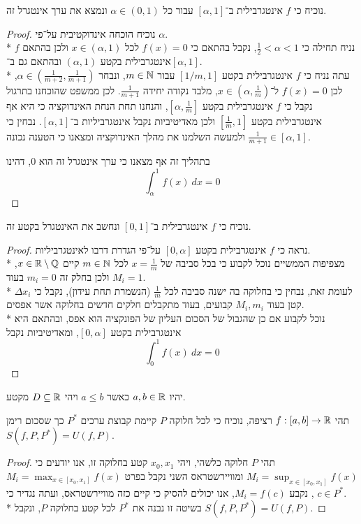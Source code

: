 \Subquestion{}
נוכיח כי $f$ אינטגרבילית ב־$[\alpha, 1]$ עבור כל $\alpha \in (0, 1)$ ונמצא את ערך אינטגרל זה.
\begin{proof}
	נוכיח הוכחה אינדוקטיבית על־פי $\alpha$. \\*
	נניח תחילה כי $\frac{1}{2} < \alpha < 1$, נקבל בהתאם כי $f(x) = 0$ לכל $x \in (\alpha, 1)$ ולכן בהתאם $f$ אינטגרבילית בקטע $(\alpha, 1)$ ובהתאם גם ב־$[\alpha, 1]$. \\*
	עתה נניח כי $f$ אינטגרבילית בקטע $[1/m, 1]$ עבור $m \in \mathbb{N}$, ונבחר $\alpha \in (\frac{1}{m + 2}, \frac{1}{m + 1})$, לכן $f(x) = 0$ ל־$x \in (\alpha, \frac{1}{m})$, מלבד נקודה יחידה $\frac{1}{m + 1}$.
	לכן ממשפט שהוכחנו בתרגול נקבל כי $f$ אינטגרבילית בקטע $[\alpha, \frac{1}{m}]$, והנחנו תחת הנחת האינדוקציה כי היא אף אינטגרבילית בקטע $[\frac{1}{m}, 1]$ ולכן מאדיטיביות נקבל אינטגרביליות ב־$[\alpha, 1]$.
	נבחין כי $\frac{1}{m + 1} \in [\alpha, 1]$ ולמעשה השלמנו את מהלך האינדוקציה ומצאנו כי הטענה נכונה.

	בתהליך זה אף מצאנו כי ערך אינטגרל זה הוא $0$, דהינו
	\[
		\int_{\alpha}^{1} f(x)\ dx = 0
	\]
\end{proof}

\Subquestion{}
נוכיח כי $f$ אינטגרבילית ב־$[0, 1]$ ונחשב את האינטגרל בקטע זה.
\begin{proof}
	נראה כי $f$ אינטגרבילית בקטע $[0, \alpha]$ על־פי הגדרת דרבו לאינטגרביליות. \\*
	מצפיפות הממשיים נוכל לקבוע כי בכל סביבה של $x = \frac{1}{m}$ לכל $m \in \mathbb{N}$ קיים $x \in \mathbb{R} \setminus \mathbb{Q}$, ולכן בחלק זה $m_i = 0$ בעוד $M_i = 1$. \\*
	לעומת זאת, נבחין כי בחלוקה בה ישנה סביבה לכל $\frac{1}{m}$ (הנשמרת תחת עידון), נקבל כי $\Delta x_i$ קטן בעוד $M_i, m_i$ קבועים, בעוד מתקבלים חלקים חדשים בחלוקה אשר אפסים. \\*
	נוכל לקבוע אם כן שהגבול של הסכום העליון של הפונקציה הוא אפס, ובהתאם היא אינטגרבילית בקטע $[0, \alpha]$, ומאדיטיביות נקבל
	\[
		\int_{0}^{1} f(x)\ dx = 0
	\]
\end{proof}

\Question{}
יהיו $a, b \in \mathbb{R}$ כאשר $a \le b$ ויהי $D \subseteq \mathbb{R}$ מקטע.

\Subquestion{}
תהי $f : [a, b] \to \mathbb{R}$ רציפה, נוכיח כי לכל חלוקה $P$ קיימת קבוצת ערכים $P^*$ כך שסכום רימן $S(f, P, P^*) = U(f, P)$.
\begin{proof}
	תהי $P$ חלוקה כלשהי, ויהי $x_0, x_1$ קטע בחלוקה זו, אנו יודעים כי $M_i = \sup_{x \in [x_0, x_1]} f(x)$ ומוויירשטראס השני נקבל בפרט $M_i = \max_{x \in [x_0, x_1]} f(x)$,
	נקבע $M_i = f(c)$, אנו יכולים להסיק כי קיים כזה מוויירשטראס, ועתה נגדיר כי $c \in P^*$. \\*
	בשיטה זו נבנה את $P^*$ לכל קטע בחלוקה $P$, ונקבל $S(f, P, P^*) = U(f, P)$.
\end{proof}


